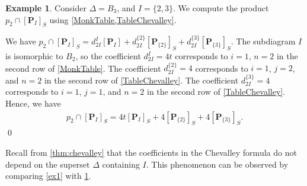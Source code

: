 \documentclass[10pt]{article}
\numberwithin{thm}{section}
\theoremstyle{definition}
\newtheorem{example}[thm]{Example}
\theoremstyle{remark}
\newcommand{\Pet}{\ensuremath{\mathbf{P}}}
\begin{document}
\begin{example}
\label{ex2}
Consider $\Delta=B_3$, and $I=\{2,3\}$.
We compute the product $p_2\cap[\Pet_I]_S$ using \cref{MonkTable,TableChevalley}.
\begin{center}
\end{center}

We have
$
p_2\cap[\Pet_I]_S=d_{2I}^I[\Pet_I]
+d_{2I}^{\{2\}}[\Pet_{\{2\}}]_S+d_{2I}^{\{3\}}[\Pet_{\{3\}}]_S.
$
The subdiagram $I$ is isomorphic to $B_2$,
so the coefficient $d_{2I}^I=4t$ corresponds to $i=1$, $n=2$ in the second row of \cref{MonkTable}.
The coefficient $d_{2I}^{\{2\}}=4$ corresponds to $i=1$, $j=2$, and $n=2$ in the second row of \cref{TableChevalley}.
The coefficient $d_{2I}^{\{3\}}=4$ corresponds to $i=1$, $j=1$, and $n=2$ in the second row of \cref{TableChevalley}.
Hence, we have 
\begin{align*}
p_2\cap[\Pet_I]_S=4t[\Pet_I]_S+4[\Pet_{\{2\}}]_S+4[\Pet_{\{3\}}]_S.
\end{align*}
\qed
\end{example}
Recall from \cref{thm:chevalley} that the coefficients in the Chevalley formula do not depend on the superset $\Delta$ containing $I$.
This phenomenon can be observed by comparing \cref{ex1} with \cref{ex2}.
\end{document}
